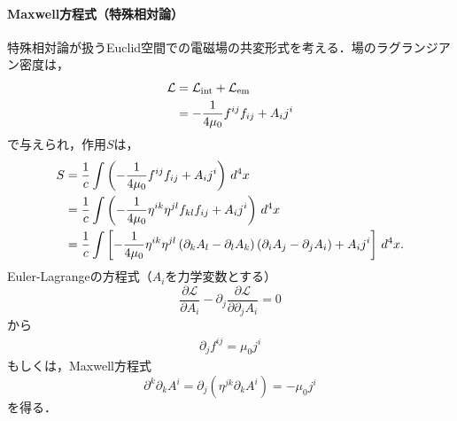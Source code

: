 \documentclass[a4paper]{ltjsreport}
\begin{document}
\paragraph{Maxwell方程式（特殊相対論）}
特殊相対論が扱うEuclid空間での電磁場の共変形式を考える．場のラグランジアン密度は，
\begin{align}
  \mathcal{L} &= \mathcal{L}_\text{int} + \mathcal{L}_\text{em}\notag\\
  &=  - \dfrac{1}{4\mu_0}f^{ij}f_{ij} + A_ij^i\label{spc_L}
\end{align}
で与えられ，作用$S$は，
\begin{align*}
  S &= \dfrac{1}{c}\int\left( - \dfrac{1}{4\mu_0}f^{ij}f_{ij} + A_ij^i\right)\,d^4x\notag\\
  &= \dfrac{1}{c}\int\left( - \dfrac{1}{4\mu_0}\eta^{ik}\eta^{jl}f_{kl}f_{ij} + A_ij^i\right)\,d^4x\notag\\
  &= \dfrac{1}{c}\int\left[ - \dfrac{1}{4\mu_0}\eta^{ik}\eta^{jl}\left(\partial_kA_l - \partial_lA_k\right)\left(\partial_iA_j - \partial_jA_i\right) + A_ij^i\right]\,d^4x .
\end{align*}
Euler-Lagrangeの方程式（$A_i$を力学変数とする）
\[
\dfrac{\partial{\mathcal{L}}}{\partial{}A_i} - \partial_j\dfrac{\partial{\mathcal{L}}}{\partial\partial_jA_i} = 0
\]
から
\begin{align}
  \partial_jf^{ij}=\mu_0j^i \label{spc_Maxwell}
\end{align}
もしくは，Maxwell方程式
\[ \partial^k\partial_kA^i = \partial_j\left(\eta^{jk}\partial_kA^i\right) =  - \mu_0j^i \]
を得る．
\end{document}
